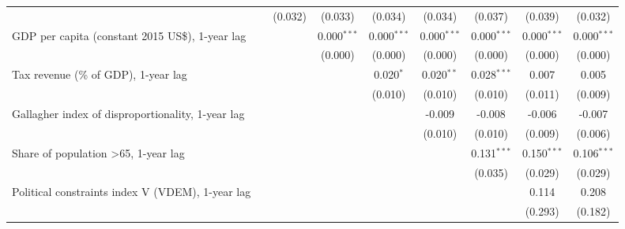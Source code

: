 \begin{table}[htbp]
\begin{tabular}{lcccccccc}
                                                                            &              & (0.032)       & (0.033)        & (0.034)        & (0.034)        & (0.037)        & (0.039)        & (0.032)\\   
      GDP per capita (constant 2015 US\$), 1-year lag                       &              &               & 0.000$^{***}$  & 0.000$^{***}$  & 0.000$^{***}$  & 0.000$^{***}$  & 0.000$^{***}$  & 0.000$^{***}$\\   
                                                                            &              &               & (0.000)        & (0.000)        & (0.000)        & (0.000)        & (0.000)        & (0.000)\\   
      Tax revenue (\% of GDP), 1-year lag                                   &              &               &                & 0.020$^{*}$    & 0.020$^{**}$   & 0.028$^{***}$  & 0.007          & 0.005\\   
                                                                            &              &               &                & (0.010)        & (0.010)        & (0.010)        & (0.011)        & (0.009)\\   
      Gallagher index of disproportionality, 1-year lag                     &              &               &                &                & -0.009         & -0.008         & -0.006         & -0.007\\   
                                                                            &              &               &                &                & (0.010)        & (0.010)        & (0.009)        & (0.006)\\   
      Share of population >65, 1-year lag                                   &              &               &                &                &                & 0.131$^{***}$  & 0.150$^{***}$  & 0.106$^{***}$\\   
                                                                            &              &               &                &                &                & (0.035)        & (0.029)        & (0.029)\\   
      Political constraints index V (VDEM), 1-year lag                      &              &               &                &                &                &                & 0.114          & 0.208\\   
                                                                            &              &               &                &                &                &                & (0.293)        & (0.182)\\   

\end{tabular}
\end{table}
